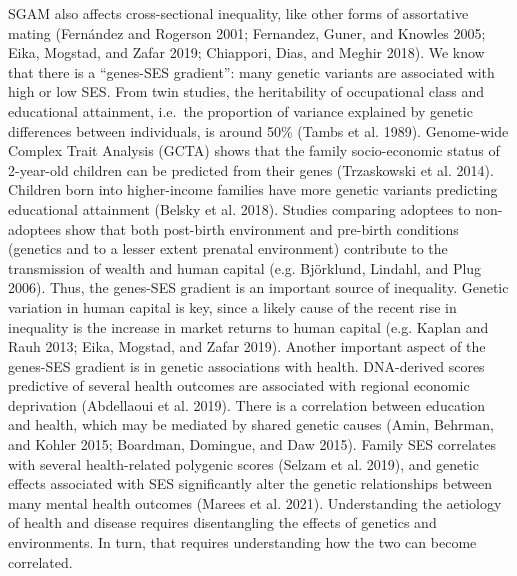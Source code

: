 \documentclass[
]{article}
\theoremstyle{definition}
\theoremstyle{definition}
\theoremstyle{definition}
\theoremstyle{definition}
\theoremstyle{remark}
\begin{document}
SGAM also affects cross-sectional inequality, like other forms of assortative
mating (Fernández and Rogerson 2001; Fernandez, Guner, and Knowles 2005; Eika, Mogstad, and Zafar 2019; Chiappori, Dias, and Meghir 2018). We know that there is a ``genes-SES gradient'': many
genetic variants are associated with high or low SES. From twin studies, the
heritability of occupational class and educational attainment, i.e.~the
proportion of variance explained by genetic differences between individuals, is
around 50\% (Tambs et al. 1989). Genome-wide Complex Trait Analysis (GCTA) shows that
the family socio-economic status of 2-year-old children can be predicted from
their genes (Trzaskowski et al. 2014). Children born into higher-income families have
more genetic variants predicting educational attainment (Belsky et al. 2018).
Studies comparing adoptees to non-adoptees show that both post-birth environment
and pre-birth conditions (genetics and to a lesser extent prenatal environment)
contribute to the transmission of wealth and human capital (e.g. Björklund, Lindahl, and Plug 2006). Thus, the genes-SES gradient is an important source of
inequality. Genetic variation in human capital is key, since a likely cause of
the recent rise in inequality is the increase in market returns to human capital
(e.g. Kaplan and Rauh 2013; Eika, Mogstad, and Zafar 2019). Another important aspect of the
genes-SES gradient is in genetic associations with health. DNA-derived scores
predictive of several health outcomes are associated with regional economic
deprivation (Abdellaoui et al. 2019). There is a correlation between education
and health, which may be mediated by shared genetic causes (Amin, Behrman, and Kohler 2015; Boardman, Domingue, and Daw 2015). Family SES correlates with several health-related polygenic
scores (Selzam et al. 2019), and genetic effects associated with SES
significantly alter the genetic relationships between many mental health
outcomes (Marees et al. 2021). Understanding the aetiology of health and disease
requires disentangling the effects of genetics and environments. In turn, that
requires understanding how the two can become correlated.
\end{document}
